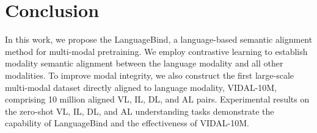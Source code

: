 \documentclass{article} \usepackage{iclr2024_conference,times}
\begin{document}
\section{Conclusion}
In this work, we propose the LanguageBind, a language-based semantic alignment method for multi-modal pretraining. We employ contrastive learning to establish modality semantic alignment between the language modality and all other modalities. To improve modal integrity, we also construct the first large-scale multi-modal dataset directly aligned to language modality, VIDAL-10M, comprising 10 million aligned VL, IL, DL, and AL pairs. Experimental results on the zero-shot VL, IL, DL, and AL understanding tasks demonstrate the capability of LanguageBind and the effectiveness of VIDAL-10M.
\end{document}
